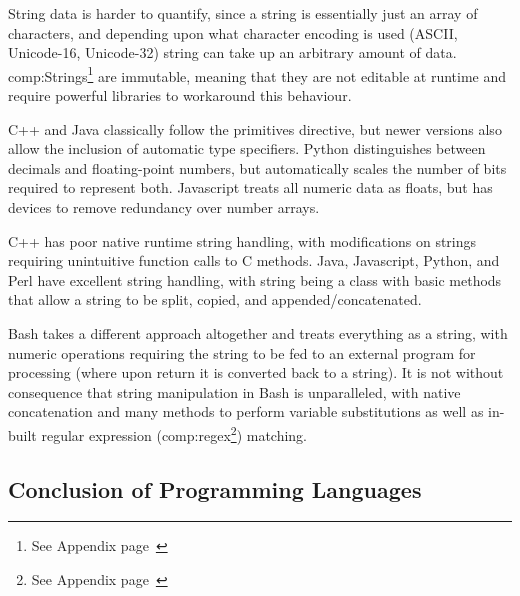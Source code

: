 String data is harder to quantify, since a string is essentially just an array of characters, and depending upon what character encoding is used (ASCII, Unicode-16, Unicode-32)  string can take up an arbitrary amount of data. \gls{comp:Strings}\footnote{See Appendix page~\pageref{ref:app:strings}} are immutable, meaning that they are not editable at runtime and require powerful libraries to workaround this behaviour.

C++ and Java classically follow the primitives directive, but newer versions also allow the inclusion of automatic type specifiers. Python distinguishes between decimals and floating-point numbers, but automatically scales the number of bits required to represent both.  Javascript treats all numeric data as floats, but has devices to remove redundancy over number arrays. 

C++ has poor native runtime string handling, with modifications on strings requiring unintuitive function calls to C methods. Java, Javascript, Python, and Perl have excellent string handling, with string being a class with basic methods that allow a string to be split, copied, and appended/concatenated. 

Bash takes a different approach altogether and treats everything as a string, with numeric operations requiring the string to be fed to an external program for processing (where upon return it is converted back to a string). It is not without consequence that string manipulation in Bash is unparalleled, with native concatenation and many methods to perform variable substitutions as well as in-built regular expression (\gls{comp:regex}\footnote{See Appendix page~\pageref{ref:app:regex}}) matching.



\subsection{Conclusion of Programming Languages}

